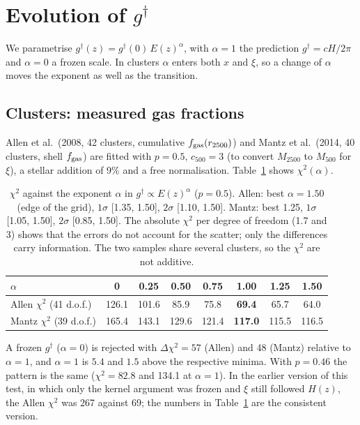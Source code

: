 \documentclass[11pt,a4paper]{article}
\newcommand{\gdag}{g^{\dagger}}
\newcommand{\fgas}{f_{\rm gas}}
\begin{document}
\section{Evolution of $\gdag$}
\label{sec:gz}
We parametrise $\gdag(z)=\gdag(0)\,E(z)^{\alpha}$, with $\alpha=1$ the prediction $\gdag=cH/2\pi$ and $\alpha=0$ a frozen scale. In clusters $\alpha$ enters both $x$ and $\xi$, so a change of $\alpha$ moves the exponent as well as the transition.

\subsection{Clusters: measured gas fractions}
Allen et al.\ (2008, 42 clusters, cumulative $\fgas(r_{2500})$) and Mantz et al.\ (2014, 40 clusters, shell $\fgas$) are fitted with $p=0.5$, $c_{500}=3$ (to convert $M_{2500}$ to $M_{500}$ for $\xi$), a stellar addition of 9\% and a free normalisation. Table~\ref{tab:alpha} shows $\chi^2(\alpha)$.

\begin{table}[h]
\centering\small
\begin{tabular}{lccccccc}
\toprule
$\alpha$ & 0 & 0.25 & 0.50 & 0.75 & 1.00 & 1.25 & 1.50 \\
\midrule
Allen $\chi^2$ (41 d.o.f.) & 126.1 & 101.6 & 85.9 & 75.8 & \textbf{69.4} & 65.7 & 64.0 \\
Mantz $\chi^2$ (39 d.o.f.) & 165.4 & 143.1 & 129.6 & 121.4 & \textbf{117.0} & 115.5 & 116.5 \\
\bottomrule
\end{tabular}
\caption{$\chi^2$ against the exponent $\alpha$ in $\gdag\propto E(z)^\alpha$ ($p=0.5$). Allen: best $\alpha=1.50$ (edge of the grid), $1\sigma$ [1.35, 1.50], $2\sigma$ [1.10, 1.50]. Mantz: best 1.25, $1\sigma$ [1.05, 1.50], $2\sigma$ [0.85, 1.50]. The absolute $\chi^2$ per degree of freedom (1.7 and 3) shows that the errors do not account for the scatter; only the differences carry information. The two samples share several clusters, so the $\chi^2$ are not additive.}
\label{tab:alpha}
\end{table}

A frozen $\gdag$ ($\alpha=0$) is rejected with $\Delta\chi^2=57$ (Allen) and 48 (Mantz) relative to $\alpha=1$, and $\alpha=1$ is $5.4$ and $1.5$ above the respective minima. With $p=0.46$ the pattern is the same ($\chi^2=82.8$ and 134.1 at $\alpha=1$). In the earlier version of this test, in which only the kernel argument was frozen and $\xi$ still followed $H(z)$, the Allen $\chi^2$ was 267 against 69; the numbers in Table~\ref{tab:alpha} are the consistent version.
\end{document}
